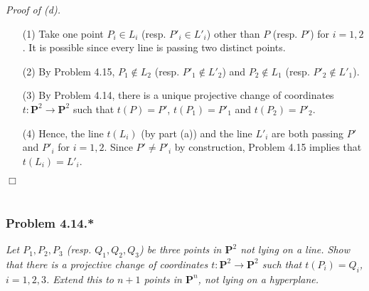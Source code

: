 \documentclass{article}
\begin{document}
\emph{Proof of (d).}
\begin{enumerate}
\item[(1)]
  Take one point $P_i \in L_i$ (resp. $P'_i \in L'_i$) other than $P$ (resp. $P'$) for $i = 1, 2$.
  It is possible since every line is passing two distinct points.

\item[(2)]
  By Problem 4.15, $P_1 \not\in L_2$ (resp. $P'_1 \not\in L'_2$) and
  $P_2 \not\in L_1$ (resp. $P'_2 \not\in L'_1$).

\item[(3)]
  By Problem 4.14,
  there is a unique projective change of coordinates $t: \mathbf{P}^2 \to \mathbf{P}^2$
  such that $t(P) = P'$, $t(P_1) = P'_1$ and $t(P_2) = P'_2$.

\item[(4)]
  Hence, the line $t(L_i)$ (by part (a)) and the line $L'_i$ are both passing $P'$ and $P'_i$
  for $i = 1, 2$.
  Since $P' \neq P'_i$ by construction, Problem 4.15 implies that $t(L_i) = L'_i$.
\end{enumerate}
$\Box$ \\\\






\subsubsection*{Problem 4.14.*}
\emph{Let $P_1, P_2, P_3$ (resp. $Q_1, Q_2, Q_3$) be three points in $\mathbf{P}^2$
not lying on a line.
Show that there is a projective change of coordinates
$t: \mathbf{P}^2 \to \mathbf{P}^2$ such that $t(P_i) = Q_i$, $i = 1, 2, 3$.
Extend this to $n+1$ points in $\mathbf{P}^{n}$, not lying on a hyperplane.} \\
\end{document}
